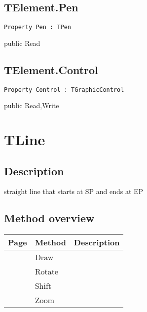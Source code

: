 \subsection{TElement.Pen}
\label{hmi:drawncontrol:telement:pen}
\begin{FPCList}
\Declaration 

\begin{verbatim}
Property Pen : TPen
\end{verbatim}
\Visibility
public
\Access
Read
\end{FPCList}
\subsection{TElement.Control}
\label{hmi:drawncontrol:telement:control}
\begin{FPCList}
\Declaration 

\begin{verbatim}
Property Control : TGraphicControl
\end{verbatim}
\Visibility
public
\Access
Read,Write
\end{FPCList}
\section{TLine}
\label{hmi:drawncontrol:tline}
\subsection{Description}
straight line that starts at SP and ends at EP%
\subsection{Method overview}
\label{hmi:drawncontrol:tline:methods}
\begin{tabularx}{\textwidth}{llX}
Page & Method & Description  \\ \hline
\pageref{hmi:drawncontrol:tline:draw} & Draw  &  \\
\pageref{hmi:drawncontrol:tline:rotate} & Rotate  &  \\
\pageref{hmi:drawncontrol:tline:shift} & Shift  &  \\
\pageref{hmi:drawncontrol:tline:zoom} & Zoom  &  \\
\hline
\end{tabularx}

